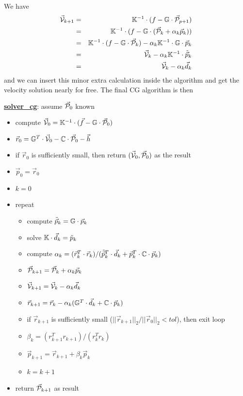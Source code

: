 We have 
\begin{eqnarray}
\vec{\cal V}_{k+1} 
&=& {\mathbb{K}}^{-1}\cdot (f - {\mathbb{G}}\cdot \vec{\cal P}_{p+1} )\\
&=& {\mathbb{K}}^{-1}\cdot (f - {\mathbb{G}}\cdot (\vec{\cal P}_k+\alpha_k \vec{p}_k) ) \\
&=& {\mathbb{K}}^{-1}\cdot (f - {\mathbb{G}}\cdot \vec{\cal P}_k) - \alpha_k {\mathbb{K}}^{-1}\cdot {\mathbb{G}} \cdot \vec{p}_k \\
&=& \vec{\cal V}_k - \alpha_k {\mathbb{K}}^{-1}\cdot \tilde{\vec{p}}_k  \\
&=& \vec{\cal V}_k - \alpha_k \vec{d}_k 
\end{eqnarray}
and we can insert this minor extra calculation inside the algorithm and get the velocity solution 
nearly for free. The final CG algorithm is then 

\begin{mdframed}[backgroundcolor=blue!5]
\underline{\bf solver\_cg}: assume $\vec{\cal P}_0$ known
\begin{itemize}
\item compute $\vec{\cal V}_0={\mathbb{K}}^{-1}\cdot (\vec{f}-{\mathbb{G}} \cdot \vec{\cal P}_0)$
\item $\vec{r}_0 = {\mathbb{G}}^T\cdot \vec{\cal V}_0 -{\mathbb{C}} \cdot \vec{\cal P}_0 - \vec{h}$ 
\item if $\vec{r}_0$ is sufficiently small, then return $(\vec{\cal V}_0,\vec{\cal P}_0)$ as the result
\item $\vec{p}_0=\vec{r}_0$
\item $k=0$
\item repeat
\begin{itemize}
\item compute $\tilde{\vec{p}}_k = {\mathbb{G}} \cdot \vec{p}_k$
\item solve ${\mathbb{K}}\cdot \vec{d}_k = \tilde{p}_k$
\item compute $\alpha_k=(\vec{r}_k^T \cdot  \vec{r}_k)/(\tilde{\vec{p}}_k^T \cdot \vec{d}_k 
      + \vec{p}_k^T \cdot {\mathbb{C}}\cdot \vec{p}_k)$
\item $\vec{\cal P}_{k+1} = \vec{\cal P}_k+\alpha_k \vec{p}_k$
\item $ \vec{\cal V}_{k+1} = \vec{\cal V}_k - \alpha_k \vec{d}_k$
\item $\vec{r}_{k+1} = \vec{r}_k - \alpha_k ({\mathbb{G}}^T \cdot \vec{d}_k + {\mathbb{C}} \cdot \vec{p}_k) $
\item if $\vec{r}_{k+1}$ is sufficiently small ($||\vec{r}_{k+1}||_2/||\vec{r}_0||_2 <tol$), then exit loop
\item $\beta_k=(r_{k+1}^T r_{k+1})/(r_k^T r_k)$
\item $\vec{p}_{k+1} =\vec{r}_{k+1}+ \beta_k \vec{p}_k$
\item $k=k+1$
\end{itemize}
\item return $\vec{\cal P}_{k+1}$ as result
\end{itemize}
\end{mdframed}

